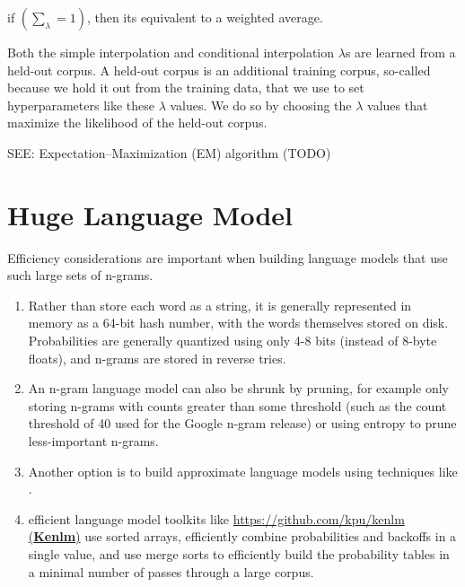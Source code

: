 if \( \left( \sum_\lambda = 1 \right)\), then its equivalent to a weighted average.

Both the simple interpolation and conditional interpolation $\lambda$s are learned from a held-out corpus. A held-out corpus is an additional training corpus, so-called because we hold it out from the training data, that we use to set hyperparameters like these $\lambda$ values. We do so by choosing the $\lambda$ values that maximize the likelihood of the held-out corpus.

SEE: Expectation–Maximization (EM) algorithm (TODO)


\section{Huge Language Model}
Efficiency considerations are important when building language models that use such large sets of n-grams. 
\begin{enumerate}
    \item Rather than store each word as a string, it is generally represented in memory as a 64-bit hash number, with the words themselves stored on disk. Probabilities are generally quantized using only 4-8 bits (instead of 8-byte floats), and n-grams are stored in reverse tries.
    \item An n-gram language model can also be shrunk by pruning, for example only storing n-grams with counts greater than some threshold (such as the count threshold of 40 used for the Google n-gram release) or using entropy to prune less-important n-grams.
    \item Another option is to build approximate language models using techniques like .
    \item efficient language model toolkits like \href{https://github.com/kpu/kenlm}{https://github.com/kpu/kenlm (\textbf{Kenlm})} use sorted arrays, efficiently combine probabilities and backoffs in a single value, and use merge sorts to efficiently build the probability tables in a minimal number of passes through a large corpus.
\end{enumerate}












































